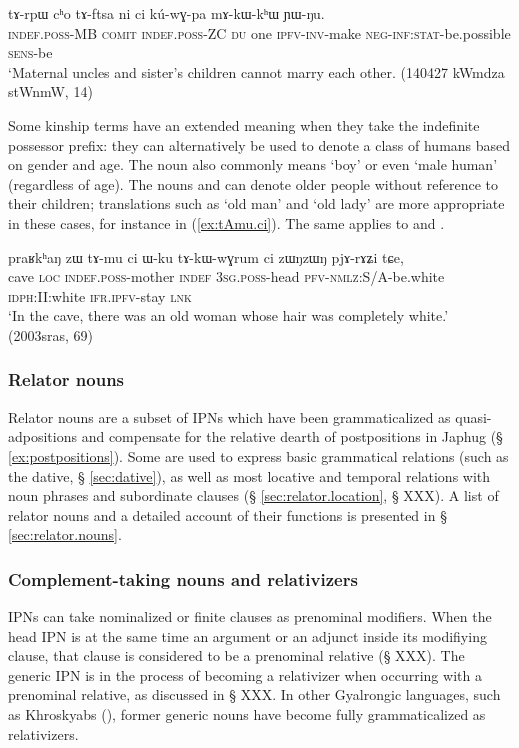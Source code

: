 \begin{exe}
\ex \label{ex:tArpW.tAftsa}
\gll tɤ-rpɯ cʰo tɤ-ftsa ni ci kú-wɣ-pa mɤ-kɯ-kʰɯ ɲɯ-ŋu. \\
\textsc{indef.poss}-MB \textsc{comit} \textsc{indef.poss}-ZC \textsc{du} one \textsc{ipfv}-\textsc{inv}-make \textsc{neg}-\textsc{inf}:\textsc{stat}-be.possible  \textsc{sens}-be \\
\glt `Maternal uncles and sister's children cannot marry each other.  (140427 kWmdza stWnmW, 14)
\end{exe}

Some kinship terms have an extended meaning when they take the indefinite possessor prefix: they can alternatively be used to denote a class of humans based on gender and age. The noun  also commonly means `boy' or even `male human' (regardless of age). The nouns  and  can denote older people without reference to their children; translations such as `old man' and `old lady' are more appropriate in these cases, for instance in (\ref{ex:tAmu.ci}). The same applies to   and .


\begin{exe}
\ex \label{ex:tAmu.ci}
\gll praʁkʰaŋ  zɯ tɤ-mu ci ɯ-ku tɤ-kɯ-wɣrum ci zɯŋzɯŋ pjɤ-rɤʑi tɕe, \\
cave \textsc{loc} \textsc{indef.poss}-mother \textsc{indef} \textsc{3sg}.\textsc{poss}-head \textsc{pfv}-\textsc{nmlz}:S/A-be.white \textsc{idph}:II:white \textsc{ifr}.\textsc{ipfv}-stay \textsc{lnk} \\
\glt `In the cave, there was an old woman whose hair was completely white.' (2003sras, 69)
\end{exe}

\subsubsection{Relator nouns}
Relator nouns are a subset of IPNs which have been grammaticalized as quasi-adpositions and compensate for the relative dearth of postpositions in Japhug  (§ \ref{ex:postpositions}). Some are used to express basic grammatical relations (such as the dative, § \ref{sec:dative}), as well as most locative and temporal relations with noun phrases  and subordinate clauses (§ \ref{sec:relator.location}, § XXX).  A list of relator nouns and a detailed account of their functions is presented in § \ref{sec:relator.nouns}.

\subsubsection{Complement-taking nouns and relativizers}
IPNs can take nominalized or finite clauses as prenominal modifiers. When the head IPN is at the same time an argument or an adjunct inside its modifiying clause, that clause is considered to be a prenominal relative (§ XXX). The generic IPN  is in the process of becoming a relativizer when occurring with a prenominal relative, as discussed in § XXX. In other Gyalrongic languages, such as Khroskyabs (\citealt[519]{lai17khroskyabs}), former generic nouns have become fully grammaticalized as relativizers.

